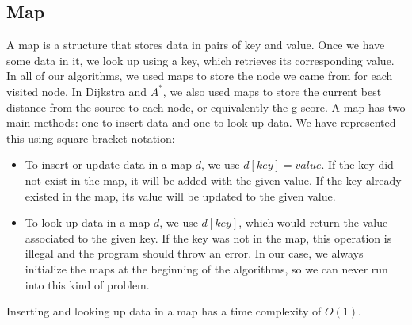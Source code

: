 \documentclass[a4paper,10pt]{report}
\begin{document}
\begin{appendices}
\section{Map}
A map is a structure that stores data in pairs of key and value. Once we have some data in it, we look up using a key, which retrieves its corresponding value. In all of our algorithms, we used maps to store the node we came from for each visited node. In Dijkstra and $A^*$, we also used maps to store the current best distance from the source to each node, or equivalently the g-score. A map has two main methods: one to insert data and one to look up data. We have represented this using square bracket notation:
\begin{itemize}
\item To insert or update data in a map $d$, we use $d[key] = value$. If the key did not exist in the map, it will be added with the given value. If the key already existed in the map, its value will be updated to the given value.
\item To look up data in a map $d$, we use $d[key]$, which would return the value associated to the given key. If the key was not in the map, this operation is illegal and the program should throw an error. In our case, we always initialize the maps at the beginning of the algorithms, so we can never run into this kind of problem.
\end{itemize}
Inserting and looking up data in a map has a time complexity of $O(1)$.

\end{appendices}
\end{document}
